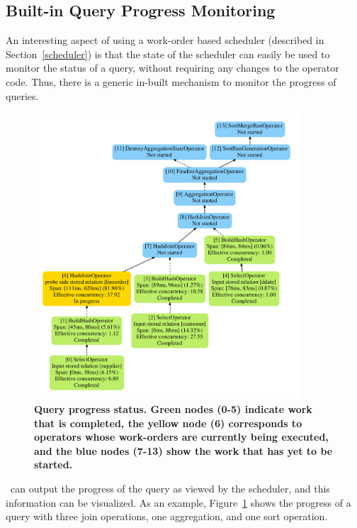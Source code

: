 \subsection{Built-in Query Progress Monitoring}\label{sec:progress-monitoring}
An interesting aspect of using a work-order based scheduler (described in Section~\ref{scheduler}) is that the state of the scheduler can easily be used to monitor the status of a query, without requiring any changes to the operator code. Thus, there is a generic in-built mechanism to monitor the progress of queries.

\begin{figure}[thb]
\centering
   \includegraphics[width=\columnwidth,height=4.2in]{system/figures/q31-progress.pdf}
   \caption{\small \textbf{Query progress status. Green nodes (0-5) indicate work that is completed, the yellow node (6) corresponds to operators whose work-orders are currently being executed, and the blue nodes (7-13) show the work that has yet to be started.}}
   \label{fig-query-progress}
\end{figure}


\Quickstep\ can output the progress of the query as viewed by the scheduler, and this information can be visualized. As an example, Figure~\ref{fig-query-progress} shows the progress of a query with three join operations, one aggregation, and one sort operation.

